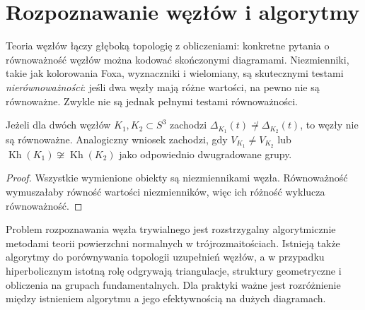 \section{Rozpoznawanie węzłów i algorytmy}
\label{sec:kt-algorytmy}

Teoria węzłów łączy głęboką topologię z obliczeniami:
konkretne pytania o równoważność węzłów można kodować
skończonymi diagramami. Niezmienniki, takie jak kolorowania
Foxa, wyznaczniki i wielomiany, są skutecznymi testami
\emph{nierównoważności}: jeśli dwa węzły mają różne wartości,
na pewno nie są równoważne. Zwykle nie są jednak pełnymi
testami równoważności.

\begin{stwierdzenie}
Jeżeli dla dwóch węzłów $K_1,K_2\subset S^3$ zachodzi
$\Delta_{K_1}(t)\not\doteq\Delta_{K_2}(t)$, to węzły
nie są równoważne. Analogiczny wniosek zachodzi,
gdy $V_{K_1}\ne V_{K_2}$ lub
$\operatorname{Kh}(K_1)\not\cong\operatorname{Kh}(K_2)$
jako odpowiednio dwugradowane grupy.
\end{stwierdzenie}

\begin{proof}
Wszystkie wymienione obiekty są niezmiennikami węzła.
Równoważność wymuszałaby równość wartości niezmienników,
więc ich różność wyklucza równoważność.
\end{proof}

\begin{uwaga}
Problem rozpoznawania węzła trywialnego jest rozstrzygalny
algorytmicznie metodami teorii powierzchni normalnych
w trójrozmaitościach. Istnieją także algorytmy do porównywania
topologii uzupełnień węzłów, a w przypadku hiperbolicznym
istotną rolę odgrywają triangulacje, struktury geometryczne
i obliczenia na grupach fundamentalnych.
Dla praktyki ważne jest rozróżnienie między istnieniem
algorytmu a jego efektywnością na dużych diagramach.
\end{uwaga}



